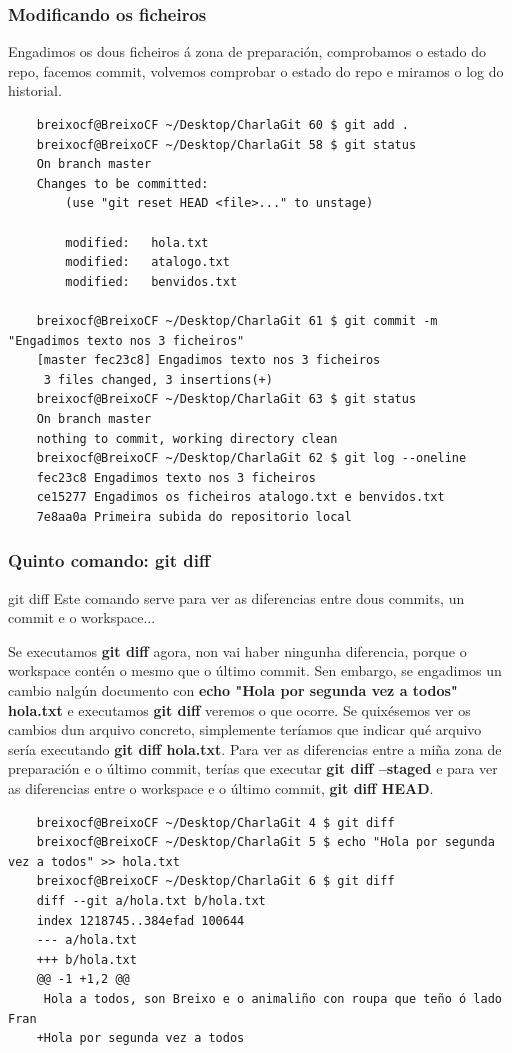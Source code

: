 \begin{frame}[fragile]
  \frametitle{Modificando os ficheiros}
  \scriptsize
  Engadimos os dous ficheiros á zona de preparación, comprobamos o estado do repo, facemos commit, volvemos comprobar o estado do repo e miramos o log do historial.
  \tiny 
\begin{verbatim}
	breixocf@BreixoCF ~/Desktop/CharlaGit 60 $ git add .
	breixocf@BreixoCF ~/Desktop/CharlaGit 58 $ git status
	On branch master
	Changes to be committed:
 		(use "git reset HEAD <file>..." to unstage)
	
		modified:   hola.txt
		modified:   atalogo.txt
		modified:   benvidos.txt
		
	breixocf@BreixoCF ~/Desktop/CharlaGit 61 $ git commit -m "Engadimos texto nos 3 ficheiros"
	[master fec23c8] Engadimos texto nos 3 ficheiros
	 3 files changed, 3 insertions(+)
	breixocf@BreixoCF ~/Desktop/CharlaGit 63 $ git status
	On branch master
	nothing to commit, working directory clean
	breixocf@BreixoCF ~/Desktop/CharlaGit 62 $ git log --oneline
	fec23c8 Engadimos texto nos 3 ficheiros
	ce15277 Engadimos os ficheiros atalogo.txt e benvidos.txt
	7e8aa0a Primeira subida do repositorio local
\end{verbatim}
\end{frame}

\begin{frame}[fragile]
  \frametitle{Quinto comando: git diff}
  \begin{block}{git diff}
    Este comando serve para ver as diferencias entre dous commits, un commit e o workspace...
  \end{block}
  \tiny
  Se executamos \textbf{git diff} agora, non vai haber ningunha diferencia, porque o workspace contén o mesmo que o último commit. Sen embargo, se engadimos un cambio nalgún documento con \textbf{echo "Hola por segunda vez a todos" \guillemotright hola.txt} e executamos \textbf{git diff} veremos o que ocorre. Se quixésemos ver os cambios dun arquivo concreto, simplemente teríamos que indicar qué arquivo sería executando \textbf{git diff hola.txt}. Para ver as diferencias entre a miña zona de preparación e o último commit, terías que executar \textbf{git diff --staged} e para ver as diferencias entre o workspace e o último commit, \textbf{git diff HEAD}.
  \tiny 
\begin{verbatim}
	breixocf@BreixoCF ~/Desktop/CharlaGit 4 $ git diff
	breixocf@BreixoCF ~/Desktop/CharlaGit 5 $ echo "Hola por segunda vez a todos" >> hola.txt
	breixocf@BreixoCF ~/Desktop/CharlaGit 6 $ git diff
	diff --git a/hola.txt b/hola.txt
	index 1218745..384efad 100644
	--- a/hola.txt
	+++ b/hola.txt
	@@ -1 +1,2 @@
	 Hola a todos, son Breixo e o animaliño con roupa que teño ó lado Fran
	+Hola por segunda vez a todos
\end{verbatim}
\end{frame}

